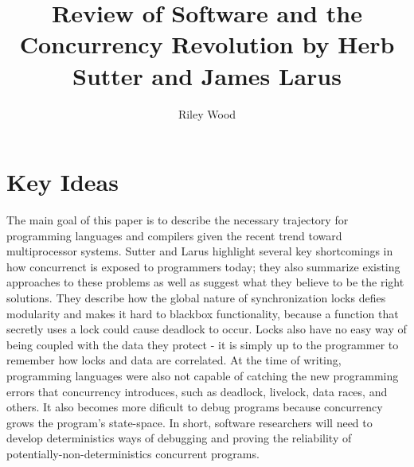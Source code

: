 \documentclass{article}
\title{Review of Software and the Concurrency Revolution by Herb Sutter and James Larus}
\author{Riley Wood}
\begin{document}
\maketitle

\section*{Key Ideas}
The main goal of this paper is to describe the necessary trajectory for programming languages and compilers given the recent trend toward multiprocessor systems. Sutter and Larus highlight several key shortcomings in how concurrenct is exposed to programmers today; they also summarize existing approaches to these problems as well as suggest what they believe to be the right solutions. They describe how the global nature of synchronization locks defies modularity and makes it
hard to blackbox functionality, because a function that secretly uses a lock could cause deadlock to occur. Locks also have no easy way of being coupled with the data they protect - it is simply up to the programmer to remember how locks and data are correlated. At the time of writing, programming languages were also not capable of catching the new programming errors that concurrency introduces, such as deadlock, livelock, data races, and others. It also becomes more dificult to debug
programs because concurrency grows the program's state-space. In short, software researchers will need to develop deterministics ways of debugging and proving the reliability of potentially-non-deterministics concurrent programs.
\end{document}
